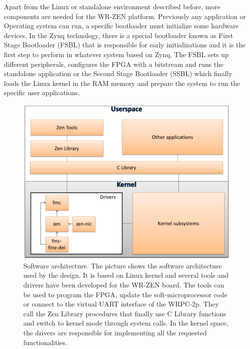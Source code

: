 Apart from the Linux or standalone environment described before, more 
components are needed  for the WR-ZEN platform. Previously any application or 
Operating system can run, a specific bootloader must initialize some hardware 
devices. In the Zynq technology, there is a special bootloader known as First 
Stage Bootloader (FSBL) that is responsible for early initializations and it is 
the first step to perform in whatever system based on Zynq. The FSBL sets up 
different peripherals, configures the FPGA with a bitstream and runs the 
standalone application or the Second Stage Bootloader (SSBL) which finally 
loads the Linux kernel in the RAM memory and prepare the system to run the 
specific user applications.

\begin{figure}[H]
	\centering
	\includegraphics[scale=0.4]{img/software_architecture}
	\caption{Software architecture. The picture shows the software architecture
		used by the design. It is based on Linux kernel and several tools and drivers
		have been developed for the WR-ZEN board. The tools can be used to program 
		the FPGA, update the soft-microprocessor code or connect to the virtual UART
		interface of the WRPC-2p. They call the Zen Library procedures that finally
		use C Library functions and switch to kernel mode through system calls. In the
		kernel space, the drivers are responsible for implementing all the requested 
		functionalities. }
	\label{fig:software_architecture}
\end{figure}
